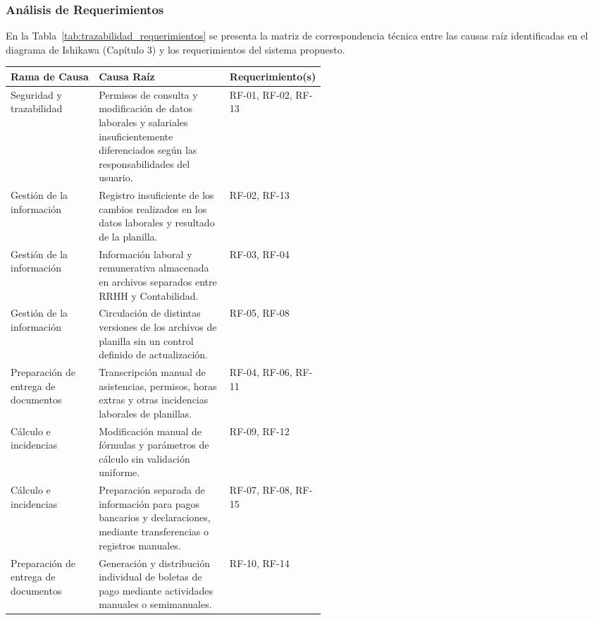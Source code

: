 
\subsubsection{Análisis de Requerimientos}

En la Tabla~\ref{tab:trazabilidad_requerimientos} se presenta la matriz de correspondencia técnica entre las causas raíz identificadas en el diagrama de Ishikawa (Capítulo 3) y los requerimientos del sistema propuesto.

\par
\noindent
\begin{minipage}{\linewidth}

    \begingroup
    \renewcommand{\baselinestretch}{1}
    \footnotesize
    \setlength{\tabcolsep}{4pt}
    \renewcommand{\arraystretch}{1.2}

    \begin{tabularx}{\linewidth}{@{}p{0.28\linewidth}Xp{0.24\linewidth}@{}}
        \toprule
        \textbf{Rama de Causa} & \textbf{Causa Raíz} & \textbf{Requerimiento(s)} \\ \midrule
        Seguridad y trazabilidad & Permisos de consulta y modificación de datos laborales y salariales insuficientemente diferenciados según las responsabilidades del usuario. & RF-01, RF-02, RF-13 \\ \addlinespace
        Gestión de la información & Registro insuficiente de los cambios realizados en los datos laborales y resultado de la planilla. & RF-02, RF-13 \\ \addlinespace
        Gestión de la información & Información laboral y remunerativa almacenada en archivos separados entre RRHH y Contabilidad. & RF-03, RF-04 \\ \addlinespace
        Gestión de la información & Circulación de distintas versiones de los archivos de planilla sin un control definido de actualización. & RF-05, RF-08 \\ \addlinespace
        Preparación de entrega de documentos & Transcripción manual de asistencias, permisos, horas extras y otras incidencias laborales de planillas. & RF-04, RF-06, RF-11 \\ \addlinespace
        Cálculo e incidencias & Modificación manual de fórmulas y parámetros de cálculo sin validación uniforme. & RF-09, RF-12 \\ \addlinespace
        Cálculo e incidencias & Preparación separada de información para pagos bancarios y declaraciones, mediante transferencias o registros manuales. & RF-07, RF-08, RF-15 \\ \addlinespace
        Preparación de entrega de documentos & Generación y distribución individual de boletas de pago mediante actividades manuales o semimanuales. & RF-10, RF-14 \\ \bottomrule
    \end{tabularx}
    \endgroup

\end{minipage}
\finBloqueAPA


